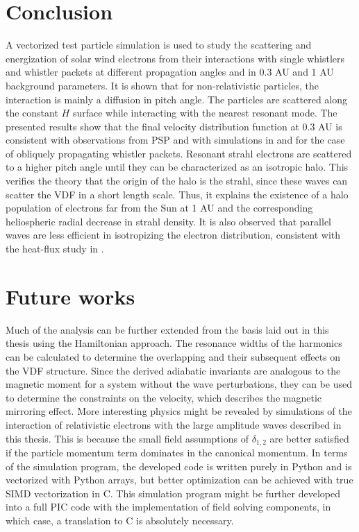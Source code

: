 
\section{Conclusion}\label{sec:conclusion}
A vectorized test particle simulation is used to study the scattering and
energization of solar wind electrons from their interactions with single
whistlers and whistler packets at different propagation angles and in 0.3 AU and
1 AU background parameters. It is shown that for non-relativistic particles, 
the interaction is mainly a diffusion in pitch angle. The particles are 
scattered along the constant $H$ surface while interacting with the nearest 
resonant mode. The presented results show that the final velocity distribution 
function at 0.3 AU is consistent with observations from PSP 
\citep{Cattell2021b,Halekas2020b} and with simulations in 
\cite{RobergClark2019} and \cite{Micera2020} for the case of obliquely 
propagating whistler packets. Resonant strahl electrons are scattered to a 
higher pitch angle until they can be characterized as an isotropic halo. This verifies the theory that the origin of the halo is
the strahl, since these waves can scatter the VDF in a short length scale. Thus,
it explains the existence of a halo population of electrons far from the Sun at
1 AU and the corresponding heliospheric radial decrease in strahl density. It is
also observed that parallel waves are less efficient in isotropizing the
electron distribution, consistent with the heat-flux study in \cite{Halekas2020b}.


\section{Future works}\label{sec:future_works}

Much of the analysis can be further extended from the basis laid out in this
thesis using the Hamiltonian approach. The resonance widths of the
harmonics can be calculated to determine the overlapping and their subsequent
effects on the VDF structure. Since the derived adiabatic invariants are
analogous to the magnetic moment for a system without the wave perturbations,
they can be used to determine the constraints on the velocity, which describes
the magnetic mirroring effect. More interesting physics might be revealed by
simulations of the interaction of relativistic electrons with the large
amplitude waves described in this thesis. This is because the small field
assumptions of $\delta_{1,2}$ are better satisfied if the particle momentum term
dominates in the canonical momentum. In terms of the simulation program, the
developed code is written purely in Python and is vectorized with Python arrays, but better optimization can be achieved with true SIMD vectorization in C. This simulation program might be further developed into a full PIC code with the implementation of field solving components, in which case, a translation to C is absolutely necessary.

